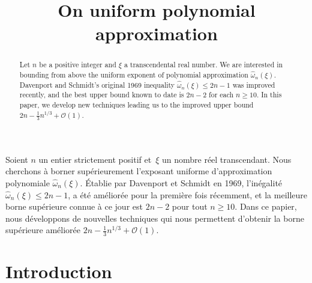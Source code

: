 \documentclass[JEP,XML,SOM,Unicode,NoFloatCountersInSection,published]{cedram}
\theoremstyle{definition}
\theoremstyle{plain}
\begin{document}
\frontmatter

\title{On uniform polynomial approximation}

\author[\initial{A.} \lastname{Poëls}]{ }
\address{Universite Claude Bernard Lyon 1, Institut Camille Jordan UMR 5208, \\
69622 Villeurbanne, France}



\begin{abstract}
Let $n$ be a positive integer and $\xi$ a transcendental real number. We are interested in bounding from above the uniform exponent of polynomial approximation $\widehat{\omega}_n(\xi)$. Davenport and Schmidt's original 1969 inequality $\widehat{\omega}_n(\xi)\leq 2n-1$ was improved recently, and the best upper bound known to date is $2n-2$ for each $n\geq 10$. In this paper, we develop new techniques leading us to the improved upper bound $2n-\frac{1}{3}n^{1/3}+\mathcal{O}(1)$.
\end{abstract}



\begin{altabstract}
Soient $n$ un entier strictement positif et~$\xi$ un nombre réel transcendant. Nous cherchons à borner supérieurement l'exposant uniforme d'approximation polynomiale $\widehat{\omega}_n(\xi)$. Établie par Davenport et Schmidt en 1969, l'inégalité $\widehat{\omega}_n(\xi)\leq 2n-1$, a été améliorée pour la première fois récemment, et la meilleure borne supérieure connue à ce jour est $2n-2$ pour tout $n\geq 10$. Dans ce papier, nous développons de nouvelles techniques qui nous permettent d'obtenir la borne supérieure améliorée $2n-\frac{1}{3}n^{1/3}+\mathcal{O}(1)$.
\end{altabstract}

\maketitle
\tableofcontents

\mainmatter
\section{Introduction}
\end{document}
